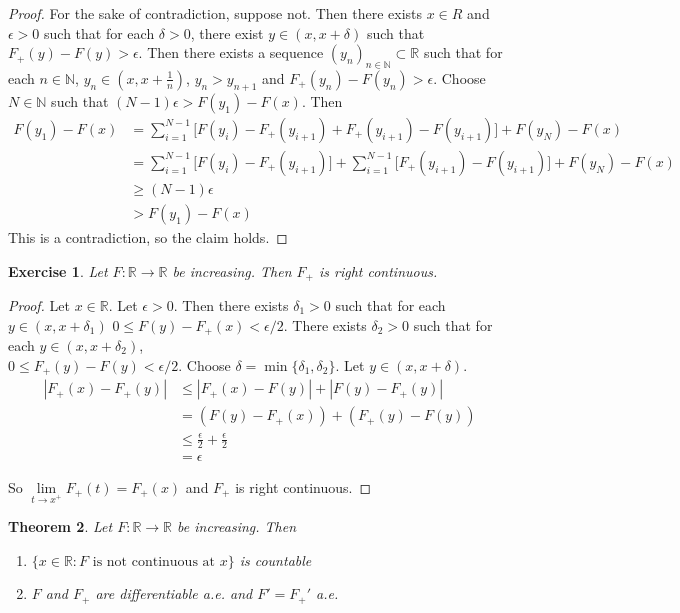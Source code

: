 \documentclass[12pt]{amsart}
\newtheorem{thm}{Theorem}[section]
\newtheorem{ex}[thm]{Exercise}
\newcommand{\del}{\delta}
\newcommand{\ep}{\epsilon}
\newcommand{\N}{\mathbb{N}}
\newcommand{\R}{\mathbb{R}}
\begin{document}
\begin{proof}
For the sake of contradiction, suppose not. Then there exists $x \in R$ and $\ep >0$ such that for each $\del >0$, there exist $y \in (x,x+\del)$ such that $F_+(y) - F(y) > \ep$. Then there exists a sequence $(y_n)_{n \in \N} \subset \R$ such that for each $n \in \N$, $y_n \in (x, x+\frac{1}{n})$, $y_n > y_{n+1}$ and $F_+(y_n) - F(y_n) > \ep$. Choose $N \in \N$ such that $(N-1)\ep > F(y_1) - F(x)$. Then 
\begin{align*}
F(y_1) - F(x) 
&= \sum_{i=1}^{N-1} \bigg[F(y_i)-F_+(y_{i+1}) + F_+(y_{i+1}) - F(y_{i+1}) \bigg] + F(y_N)- F(x)\\
& = \sum_{i=1}^{N-1} \bigg[F(y_i)-F_+(y_{i+1}) \bigg] + \sum_{i=1}^{N-1} \bigg[ F_+(y_{i+1}) - F(y_{i+1}) \bigg] + F(y_N)- F(x) \\
& \geq (N-1)\ep \\
& > F(y_1) - F(x)
\end{align*}
This is a contradiction, so the claim holds.
\end{proof}

\begin{ex}
Let $F:\R \rightarrow \R$ be increasing. Then $F_+$ is right continuous. 
\end{ex}

\begin{proof}
Let $x \in \R$. Let $\ep >0$. Then there exists $\del_1>0$ such that for each $y \in (x,x+\del_1)$ $0 \leq F(y)-F_+(x) < \ep/2$. There exists $\del_2 >0$ such that for each $y \in (x,x+\del_2)$, \\$0 \leq F_+(y)-F(y) < \ep/2$. Choose $\del = \min\{\del_1, \del_2\}$. Let $y \in (x, x+\del)$.
\begin{align*}
|F_+(x) - F_+(y)|
& \leq |F_+(x) - F(y)| + |F(y)- F_+(y)| \\
& = (F(y) - F_+(x)) + (F_+(y) - F(y)) \\
& \leq \frac{\ep}{2} + \frac{\ep}{2}\\
& = \ep
\end{align*}

So $\lim\limits_{t \rightarrow x^+} F_+(t) = F_+(x)$ and $F_+$ is right continuous.
\end{proof}

\begin{thm}
Let $F:\R \rightarrow \R$ be increasing. Then 
\begin{enumerate}
\item $\{x \in \R: F \text{ is not continuous at }x\}$ is countable
\item $F$ and $F_+$ are differentiable a.e. and $F' = F_+'$ a.e.
\end{enumerate}
\end{thm}
\end{document}
